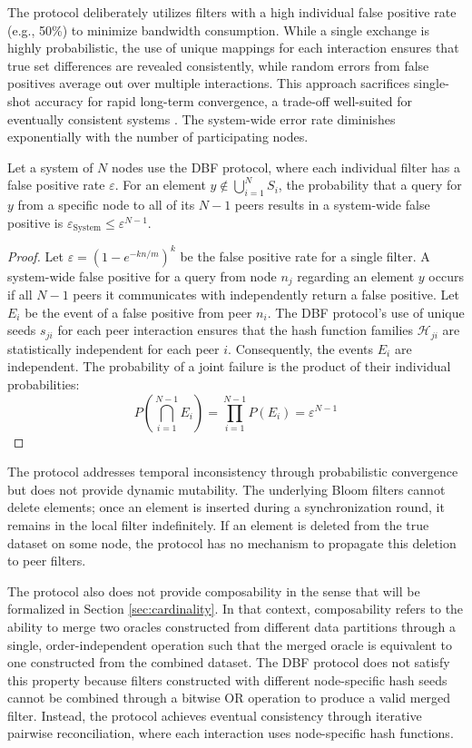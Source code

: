 The protocol deliberately utilizes filters with a high individual false positive rate (e.g., 50\%) to minimize bandwidth consumption. While a single exchange is highly probabilistic, the use of unique mappings for each interaction ensures that true set differences are revealed consistently, while random errors from false positives average out over multiple interactions. This approach sacrifices single-shot accuracy for rapid long-term convergence, a trade-off well-suited for eventually consistent systems \cite{Ramabaja2019TheDB}. The system-wide error rate diminishes exponentially with the number of participating nodes.

\begin{proposition}
    Let a system of $N$ nodes use the DBF protocol, where each individual filter has a false positive rate $\varepsilon$. For an element $y \notin \bigcup_{i=1}^N S_i$, the probability that a query for $y$ from a specific node to all of its $N-1$ peers results in a system-wide false positive is $\varepsilon_{\text{System}} \leq \varepsilon^{N-1}$.
\end{proposition}
\begin{proof}
    Let $\varepsilon = (1 - e^{-kn/m})^k$ be the false positive rate for a single filter. A system-wide false positive for a query from node $n_j$ regarding an element $y$ occurs if all $N-1$ peers it communicates with independently return a false positive. Let $E_i$ be the event of a false positive from peer $n_i$. The DBF protocol's use of unique seeds $s_{ji}$ for each peer interaction ensures that the hash function families $\mathcal{H}_{ji}$ are statistically independent for each peer $i$. Consequently, the events $E_i$ are independent. The probability of a joint failure is the product of their individual probabilities:
    $$P(\bigcap_{i=1}^{N-1} E_i) = \prod_{i=1}^{N-1} P(E_i) = \varepsilon^{N-1}$$
\end{proof}

The protocol addresses temporal inconsistency through probabilistic convergence but does not provide dynamic mutability. The underlying Bloom filters cannot delete elements; once an element is inserted during a synchronization round, it remains in the local filter indefinitely. If an element is deleted from the true dataset on some node, the protocol has no mechanism to propagate this deletion to peer filters.

The protocol also does not provide composability in the sense that will be formalized in Section \ref{sec:cardinality}. In that context, composability refers to the ability to merge two oracles constructed from different data partitions through a single, order-independent operation such that the merged oracle is equivalent to one constructed from the combined dataset. The DBF protocol does not satisfy this property because filters constructed with different node-specific hash seeds cannot be combined through a bitwise OR operation to produce a valid merged filter. Instead, the protocol achieves eventual consistency through iterative pairwise reconciliation, where each interaction uses node-specific hash functions.

